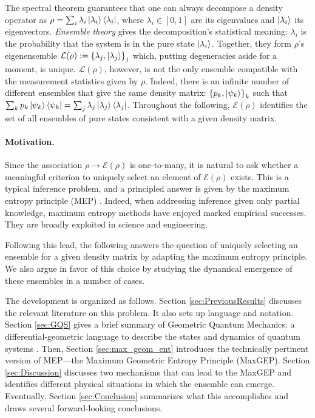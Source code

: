 \documentclass[draft,nofootinbib,pre,twocolumn,showpacs,showkeys,groupaddress,preprintnumbers,floatfix]{revtex4-1}
\newcommand{\1}{\mathbbm{1}}
\begin{document}
The spectral theorem guarantees that one can always decompose a density
operator as $\rho = \sum_{i}\lambda_i \ket{\lambda_i}\bra{\lambda_i}$, where
$\lambda_i \in [0,1]$ are its eigenvalues and $\ket{\lambda_i}$ its
eigenvectors. \emph{Ensemble theory} \cite{Pathria2011,Greiner1995} gives the
decomposition's statistical meaning: $\lambda_i$ is the probability that the
system is in the pure state $\ket{\lambda_i}$. Together, they form $\rho$'s
eigenensemble $\mathcal{L}(\rho):=\left\{ \lambda_j,\ket{\lambda_j}\right\}_j$
which, putting degeneracies aside for a moment, is unique.
$\mathcal{L}(\rho)$, however, is not the only ensemble compatible with the
measurement statistics given by $\rho$. Indeed, there is an infinite number of
different ensembles that give the same density matrix: $\left\{
p_k,\ket{\psi_k}\right\}_k$ such that $\sum_k p_k \ket{\psi_k}\bra{\psi_k} =
\sum_j \lambda_j \ket{\lambda_j}\bra{\lambda_j}$. Throughout the following,
$\mathcal{E}(\rho)$ identifies the set of all ensembles of pure states
consistent with a given density matrix.

\paragraph*{Motivation.} Since the association $\rho \to \mathcal{E}(\rho)$ is
one-to-many, it is natural to ask whether a meaningful criterion to uniquely
select an element of $\mathcal{E}(\rho)$ exists. This is a typical inference
problem, and a principled answer is given by the maximum entropy principle
(MEP) \cite{Jaynes1957,Jaynes1957a,Cover2006}. Indeed, when addressing
inference given only partial knowledge, maximum entropy methods have
enjoyed marked empirical successes. They are broadly exploited in science
and engineering.

Following this lead, the following answers the question of uniquely selecting
an ensemble for a given density matrix by adapting the maximum entropy
principle. We also argue in favor of this choice by studying the dynamical 
emergence of these ensembles in a number of cases.

The development is organized as follows. Section \ref{sec:PreviousResults}
discusses the relevant literature on this problem. It also sets up language and
notation. Section \ref{sec:GQS} gives a brief summary of Geometric Quantum
Mechanics: a differential-geometric language to describe the states and
dynamics of quantum systems
\cite{Anza20a,Anza22,STROCCHI1966,Kibble1979,Heslot1985,Gibbons1992,Ashtekar1995,Ashtekar1999,Brody2001,Bengtsson2017,Carinena2007,Chruscinski2006,Marmo2010,Avron2020,Pastorello2015,Pastorello2015a,Pastorello2016,Clemente-Gallardo2013}.
Then, Section \ref{sec:max_geom_ent} introduces the technically pertinent
version of MEP---the Maximum Geometric Entropy Principle (MaxGEP). Section
\ref{sec:Discussion} discusses two mechanisms that can lead to the MaxGEP and
identifies different physical situations in which the ensemble can emerge.
Eventually, Section \ref{sec:Conclusion} summarizes what this accomplishes and
draws several forward-looking conclusions.
\end{document}
